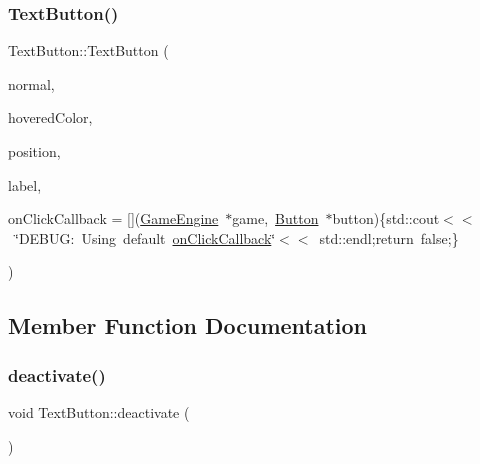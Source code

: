 \mbox{\label{class_text_button_a31beb0aab9b5f05ebe7f8141632b2eea}} 
\subsubsection{\texorpdfstring{TextButton()}{TextButton()}\hspace{0.1cm}{\footnotesize\ttfamily [2/2]}}
{\footnotesize\ttfamily Text\+Button\+::\+Text\+Button (\begin{DoxyParamCaption}\item[{sf\+::\+Texture $\ast$}]{normal,  }\item[{const sf\+::\+Color \&}]{hovered\+Color,  }\item[{const sf\+::\+Vector2f \&}]{position,  }\item[{const sf\+::\+Text \&}]{label,  }\item[{bool($\ast$)(\mbox{\hyperlink{class_game_engine}{Game\+Engine}} $\ast$game, \mbox{\hyperlink{class_button}{Button}} $\ast$button)}]{on\+Click\+Callback = {\ttfamily \mbox{[}\mbox{]}(\mbox{\hyperlink{class_game_engine}{Game\+Engine}}~$\ast$game,~\mbox{\hyperlink{class_button}{Button}}~$\ast$button)\{std\+:\+:cout$<$$<$~\char`\"{}DEBUG\+:~Using~default~\mbox{\hyperlink{class_button_abd70dfccd5cce2eb6d4cae1d684107c3}{on\+Click\+Callback}}\char`\"{}$<$$<$~std\+:\+:endl;return~false;\}} }\end{DoxyParamCaption})}



\subsection{Member Function Documentation}
\mbox{\label{class_text_button_a8b0c38245988615e9cae8795b2f177cd}} 
\subsubsection{\texorpdfstring{deactivate()}{deactivate()}}
{\footnotesize\ttfamily void Text\+Button\+::deactivate (\begin{DoxyParamCaption}{ }\end{DoxyParamCaption})\hspace{0.3cm}{\ttfamily [inline]}}

